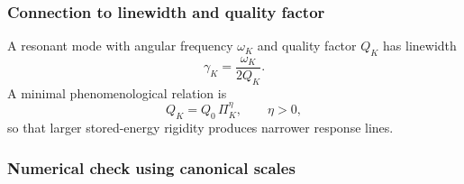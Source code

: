     \subsubsection*{Connection to linewidth and quality factor}
        
        A resonant mode with angular frequency \(\omega_K\) and quality factor \(Q_K\) has linewidth
        \begin{equation}
            \gamma_K
            =
            \frac{\omega_K}{2Q_K}.
            \label{eq:linewidth_quality_factor}
        \end{equation}
        A minimal phenomenological relation is
        \begin{equation}
            Q_K
            =
            Q_0\,\Pi_K^\eta,
            \qquad
            \eta>0,
            \label{eq:Q_rigidity_ansatz}
        \end{equation}
        so that larger stored-energy rigidity produces narrower response lines.
    
    \subsubsection*{Numerical check using canonical scales}
        
